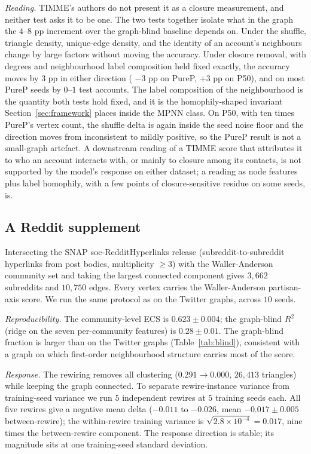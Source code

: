 \documentclass[letterpaper]{article} %
\begin{document}
\emph{Reading.} TIMME's authors do not present it as a
closure measurement, and neither test asks it to be one. The
two tests together isolate what in the graph the $4$--$8$ pp
increment over the graph-blind baseline depends on. Under the
shuffle, triangle density, unique-edge density, and the
identity of an account's neighbours change by large factors
without moving the accuracy. Under closure removal, with
degrees and neighbourhood label composition held fixed
exactly, the accuracy moves by $3$ pp in either direction (
$-3$ pp on PureP, $+3$ pp on P50), and on most PureP seeds by
$0$--$1$ test accounts. The label composition of the
neighbourhood is the quantity both tests hold fixed, and it is
the homophily-shaped invariant Section~\ref{sec:framework}
places inside the MPNN class. On P50, with ten times PureP's
vertex count, the shuffle delta is again inside the seed noise
floor and the direction moves from inconsistent to mildly
positive, so the PureP result is not a small-graph artefact. A
downstream reading of a TIMME score that attributes it to who
an account interacts with, or mainly to closure among its
contacts, is not supported by the model's response on either
dataset; a reading as node features plus label homophily, with
a few points of closure-sensitive residue on some seeds, is.

\subsection{A Reddit supplement}\label{sec:reddit}

Intersecting the SNAP soc-RedditHyperlinks release
\citep{KumarRedditHyperlinks2018} (subreddit-to-subreddit
hyperlinks from post bodies, multiplicity $\ge 3$) with the
Waller-Anderson community set \citep{WallerAnderson2021} and
taking the largest connected component gives $3{,}662$ subreddits
and $10{,}750$ edges. Every vertex carries the Waller-Anderson
partisan-axis score. We run the same protocol as on the Twitter
graphs, across $10$ seeds.

\emph{Reproducibility.} The community-level ECS is $0.623 \pm
0.004$; the graph-blind $R^2$ (ridge on the seven per-community
features) is $0.28 \pm 0.01$. The graph-blind fraction is
larger than on the Twitter graphs (Table~\ref{tab:blind}),
consistent with a graph on which first-order neighbourhood
structure carries most of the score.

\emph{Response.} The rewiring removes all clustering
($0.291 \to 0.000$, $26{,}413$ triangles) while keeping the graph
connected. To separate rewire-instance variance from
training-seed variance we run $5$ independent rewires at $5$
training seeds each. All five rewires give a negative mean
delta ($-0.011$ to $-0.026$, mean $-0.017 \pm 0.005$
between-rewire); the within-rewire training variance is
$\sqrt{2.8 \times 10^{-4}} = 0.017$, nine times the
between-rewire component. The response direction is stable;
its magnitude sits at one training-seed standard deviation.
\end{document}
